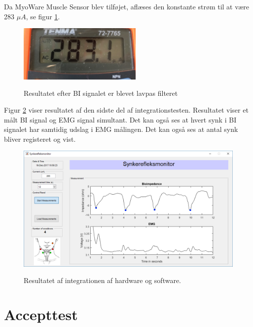 Da MyoWare Muscle Sensor blev tilføjet, aflæses den konstante strøm til at være 283 $\mu A$, se figur \ref{fig:integrationstestVCCSud2}.

 

\begin{figure}[H] 
\centering
{\includegraphics[width=6cm]
{Figure/integrationstestVCCSud}}
\caption{Resultatet efter BI signalet er blevet lavpas filteret}
\label{fig:integrationstestVCCSud2}
\end{figure}

Figur \ref{fig:guiDone} viser resultatet af den sidste del af integrationstesten. Resultatet viser et målt BI signal og EMG signal simultant. Det kan også ses at hvert synk i BI signalet har samtidig udslag i EMG målingen. Det kan også ses at antal synk bliver registeret og vist. 

\begin{figure}[H] 
\centering
{\includegraphics[width=\linewidth]
{Figure/guiDone}}
\caption{Resultatet af integrationen af hardware og software.}
\label{fig:guiDone}
\end{figure}



\section{Accepttest}
